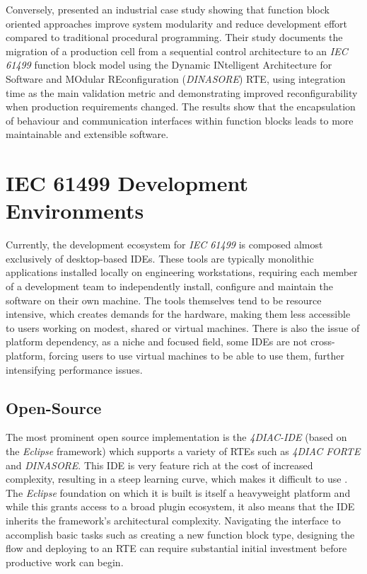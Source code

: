Conversely, \citeauthor{pinto_digital_2023} \cite{pinto_digital_2023} presented an industrial case study showing that function block oriented approaches improve system modularity and reduce development effort compared to traditional procedural programming. Their study documents the migration of a production cell from a sequential control architecture to an \textit{IEC 61499} function block model using the Dynamic INtelligent Architecture for Software and MOdular REconfiguration (\textit{DINASORE}) \ac{RTE}, using integration time as the main validation metric and demonstrating improved reconfigurability when production requirements changed. The results show that the encapsulation of behaviour and communication interfaces within function blocks leads to more maintainable and extensible software.

\section{IEC 61499 Development Environments}
Currently, the development ecosystem for \textit{IEC 61499} is composed almost exclusively of desktop-based \acp{IDE}. These tools are typically monolithic applications installed locally on engineering workstations, requiring each member of a development team to independently install, configure and maintain the software on their own machine. The tools themselves tend to be resource intensive, which creates demands for the hardware, making them less accessible to users working on modest, shared or virtual machines. There is also the issue of platform dependency, as a niche and focused field, some \acp{IDE} are not cross-platform, forcing users to use virtual machines to be able to use them, further intensifying performance issues.

\subsection{Open-Source}
The most prominent open source implementation is the \textit{4DIAC-IDE} (based on the \textit{Eclipse} framework) which supports a variety of \acp{RTE} such as \textit{4DIAC FORTE} and \textit{DINASORE}. This \ac{IDE} is very feature rich at the cost of increased complexity, resulting in a steep learning curve, which makes it difficult to use \cite{weber_usability_2019}. The \textit{Eclipse} foundation on which it is built is itself a heavyweight platform and while this grants access to a broad plugin ecosystem, it also means that the \ac{IDE} inherits the framework's architectural complexity. Navigating the interface to accomplish basic tasks such as creating a new function block type, designing the flow and deploying to an \ac{RTE} can require substantial initial investment before productive work can begin.


